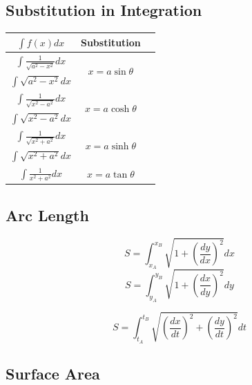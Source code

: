 \documentclass[a4paper,9pt]{scrartcl}
\begin{document}
    \subsection{Substitution in Integration}

    \begin{tabular}{|c|c|c|}
        \hline $\int f(x) dx$                     & Substitution                        \\
        \hline $\int \frac{1}{\sqrt{a^2-x^2}} dx$ & \multirow{2}{*}{$x=a\sin{\theta}$}  \\
        $\int {\sqrt{a^2-x^2}} dx$                &                                     \\
        \hline $\int \frac{1}{\sqrt{x^2-a^2}} dx$ & \multirow{2}{*}{$x=a\cosh{\theta}$} \\
        $\int {\sqrt{x^2-a^2}} dx$                &                                     \\
        \hline $\int \frac{1}{\sqrt{x^2+a^2}} dx$ & \multirow{2}{*}{$x=a\sinh{\theta}$} \\
        $\int {\sqrt{x^2+a^2}} dx$                &                                     \\
        \hline $\int \frac{1}{x^2+a^2} dx$        & $x=a\tan{\theta}$                   \\
        \hline
    \end{tabular}

    \subsection{Arc Length}
    \begin{displaymath}
        S = \int_{x_A}^{x_B} {\sqrt{1+\left( \frac{dy}{dx} \right)^2}}dx
    \end{displaymath}
    \begin{displaymath}
        S = \int_{y_A}^{y_B} {\sqrt{1+\left( \frac{dx}{dy} \right)^2}}dy
    \end{displaymath}

    \begin{displaymath}
        S = \int_{t_A}^{t_B} {\sqrt{\left( \frac{dx}{dt} \right)^2 + \left( \frac{dy}{dt} \right)^2}}dt
    \end{displaymath}

    \subsection{Surface Area}
\end{document}
